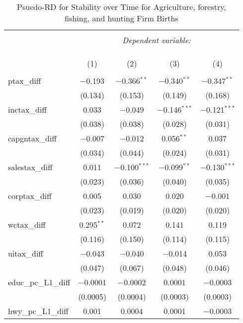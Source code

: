 
\begin{table}[!htbp] \centering 
  \caption{Psuedo-RD for Stability over Time for  Agriculture, forestry, fishing, and hunting Firm Births} 
  \label{} 
\begin{tabular}{@{\extracolsep{5pt}}lcccc} 
\\[-1.8ex]\hline 
\hline \\[-1.8ex] 
 & \multicolumn{4}{c}{\textit{Dependent variable:}} \\ 
\cline{2-5} 
\\[-1.8ex] & \multicolumn{4}{c}{ } \\ 
\\[-1.8ex] & (1) & (2) & (3) & (4)\\ 
\hline \\[-1.8ex] 
 ptax\_diff & $-$0.193 & $-$0.366$^{**}$ & $-$0.340$^{**}$ & $-$0.347$^{**}$ \\ 
  & (0.134) & (0.153) & (0.149) & (0.168) \\ 
  inctax\_diff & 0.033 & $-$0.049 & $-$0.146$^{***}$ & $-$0.121$^{***}$ \\ 
  & (0.038) & (0.038) & (0.028) & (0.031) \\ 
  capgntax\_diff & $-$0.007 & $-$0.012 & 0.056$^{**}$ & 0.037 \\ 
  & (0.034) & (0.044) & (0.024) & (0.031) \\ 
  salestax\_diff & 0.011 & $-$0.100$^{***}$ & $-$0.099$^{**}$ & $-$0.130$^{***}$ \\ 
  & (0.023) & (0.036) & (0.040) & (0.035) \\ 
  corptax\_diff & 0.005 & 0.030 & 0.020 & $-$0.001 \\ 
  & (0.023) & (0.019) & (0.020) & (0.020) \\ 
  wctax\_diff & 0.295$^{**}$ & 0.072 & 0.141 & 0.119 \\ 
  & (0.116) & (0.150) & (0.114) & (0.115) \\ 
  uitax\_diff & $-$0.043 & $-$0.040 & $-$0.014 & 0.053 \\ 
  & (0.047) & (0.067) & (0.048) & (0.046) \\ 
  educ\_pc\_L1\_diff & $-$0.0001 & $-$0.0002 & 0.0001 & $-$0.0003 \\ 
  & (0.0005) & (0.0004) & (0.0003) & (0.0003) \\ 
  hwy\_pc\_L1\_diff & 0.001 & 0.0004 & 0.0001 & $-$0.0003 \\ 

\end{tabular}
\end{table}
